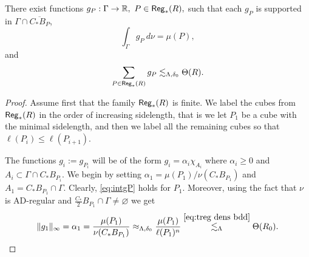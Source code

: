 \begin{lemma}\label{lem:gP}
	There exist functions $g_P:\Gamma\to{\mathbb R},\ P\in{\mathsf{Reg}}_*(R),$ such that each $g_P$ is supported in $\Gamma\cap \overline{C_* B_P}$,
	\begin{equation}\label{eq:intgP}
	\int_{\Gamma} g_P\ d\nu = \mu(P),
	\end{equation}
	and
	\begin{equation}\label{eq:sumgP}
	\sum_{P\in{\mathsf{Reg}}_*(R)} g_P \lesssim_{\Lambda,\delta_0} \Theta(R).
	\end{equation}
\end{lemma}
\begin{proof}
	Assume first that the family ${\mathsf{Reg}}_*(R)$ is finite.
	 We label the cubes from ${\mathsf{Reg}}_*(R)$ in the order of increasing sidelength, that is we let $P_1$ be a cube with the minimal sidelength, and then we label all the remaining cubes so that $\ell(P_i)\le\ell(P_{i+1})$.
	
	The functions $g_{i}:=g_{P_i}$ will be of the form $g_i = \alpha_i\chi_{A_i}$ where $\alpha_i\ge 0 $ and $A_i\subset \Gamma\cap C_* B_{P_i}$. We begin by setting $\alpha_1 = \mu(P_1)/\nu(C_* B_{P_1})$ and $A_1 = C_* B_{P_1}\cap\Gamma$. Clearly, \eqref{eq:intgP} holds for $P_1$. Moreover, using the fact that $\nu$ is AD-regular and $\frac{C_*}{2} B_{P_1}\cap\Gamma\neq\varnothing$ we get
	\begin{equation*}
	\|g_1\|_\infty = \alpha_1 = \frac{\mu(P_1)}{\nu(C_* B_{P_1})}\approx_{\Lambda,\delta_0}\frac{\mu(P_1)}{\ell(P_1)^n}\overset{\eqref{eq:treg dens bdd}}{\lesssim_{\Lambda}}\Theta(R_0).
	\end{equation*}
	

\end{proof}

